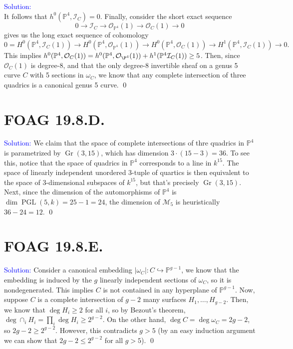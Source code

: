 \documentclass[11pt]{article}
\newcommand{\PP}{\mathbb{P}}
\newcommand{\cI}{\mathcal{I}}
\newcommand{\cM}{\mathcal{M}}
\newcommand{\cO}{\mathcal{O}}
\newcommand{\Gr}{\operatorname{Gr}}
\newcommand{\PGL}{\operatorname{PGL}}
\newenvironment{solution}{\begin{trivlist}\item[]{\textcolor{blue}{Solution:}}}{\qed \end{trivlist}}
\begin{document}
\begin{solution}
\[    \]
    It follows that $h^0(\PP^4, \cI_C) = 0$. Finally, consider the short exact sequence 
    \[
        0 \rightarrow \cI_C \rightarrow \cO_{\PP^4}(1) \rightarrow \cO_C(1) \rightarrow 0
    \]
    gives us the long exact sequence of cohomology 
    \[
        0 = H^0(\PP^4, \cI_C(1)) \rightarrow H^0(\PP^4, \cO_{\PP^4}(1)) \rightarrow H^0(\PP^4, \cO_C(1)) \rightarrow H^1(\PP^4, \cI_C(1)) \rightarrow 0.
    \]
    This implies $h^0(\PP^4, \cO_C(1)) = h^0(\PP^4, \cO_{\P^4}(1)) + h^1(\PP^4 \cI_C(1)) \geq 5$. Then, since $\cO_C(1)$ is degree-8, and that the only degree-8 invertible sheaf on a genus 5 curve $C$ with 5 sections in $\omega_C$, we know that any complete intersection of three quadrics is a canonical genus 5 curve. 
\end{solution}

\newpage

\section*{FOAG 19.8.D.}

\begin{solution}
    We claim that the space of complete intersections of thre quadrics in $\PP^4$ is parametrized by $\Gr(3, 15)$, which has dimension $3 \cdot (15-3) = 36$. To see this, notice that the space of quadrics in $\PP^4$ corresponds to a line in $k^{15}$. The space of linearly independent unordered 3-tuple of quartics is then equivalent to the space of 3-dimensional subspaces of $k^{15}$, but that's precisely $\Gr(3, 15)$. Next, since the dimension of the automorphisms of $\PP^4$ is $\dim \PGL(5, k) = 25 - 1 = 24$, the dimension of $\cM_5$ is heuristically $36 - 24 = 12$. 
\end{solution}

\newpage

\section*{FOAG 19.8.E.}

\begin{solution}
    Consider a canonical embedding $|\omega_C|: C \hookrightarrow \PP^{g-1}$, we know that the embedding is induced by the $g$ linearly independent sections of $\omega_C$, so it is nondegenerated. This implies $C$ is not contained in any hyperplane of $\PP^{g-1}$. Now, suppose $C$ is a complete intersection of $g-2$ many surfaces $H_1, \ldots, H_{g-2}$. Then, we know that $\deg H_i \geq 2$ for all $i$, so by Bezout's theorem, $\deg \cap_i H_i = \prod_i \deg H_i \geq 2^{g-2}$. On the other hand, $\deg C = \deg \omega_C = 2g - 2$, so $2g - 2 \geq 2^{g-2}$. However, this contradicts $g > 5$ (by an easy induction argument we can show that $2g - 2 \leq 2^{g-2}$ for all $g > 5$). 
\end{solution}
\end{document}
